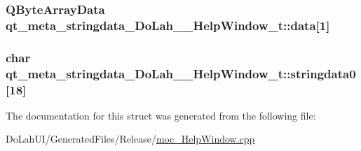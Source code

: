 \subsubsection[{data}]{\setlength{\rightskip}{0pt plus 5cm}Q\+Byte\+Array\+Data qt\+\_\+meta\+\_\+stringdata\+\_\+\+Do\+Lah\+\_\+\+\_\+\+Help\+Window\+\_\+t\+::data\mbox{[}1\mbox{]}}\label{structqt__meta__stringdata___do_lah_____help_window__t_ac48a7bbd005a7023d0a83f8c19d12c02}
\hypertarget{structqt__meta__stringdata___do_lah_____help_window__t_a8d675d0228428d8b89f5d524ffecd383}{}
\subsubsection[{stringdata0}]{\setlength{\rightskip}{0pt plus 5cm}char qt\+\_\+meta\+\_\+stringdata\+\_\+\+Do\+Lah\+\_\+\+\_\+\+Help\+Window\+\_\+t\+::stringdata0\mbox{[}18\mbox{]}}\label{structqt__meta__stringdata___do_lah_____help_window__t_a8d675d0228428d8b89f5d524ffecd383}


The documentation for this struct was generated from the following file\+:\begin{DoxyCompactItemize}
\item 
Do\+Lah\+U\+I/\+Generated\+Files/\+Release/\hyperlink{moc___help_window_8cpp}{moc\+\_\+\+Help\+Window.\+cpp}\end{DoxyCompactItemize}
